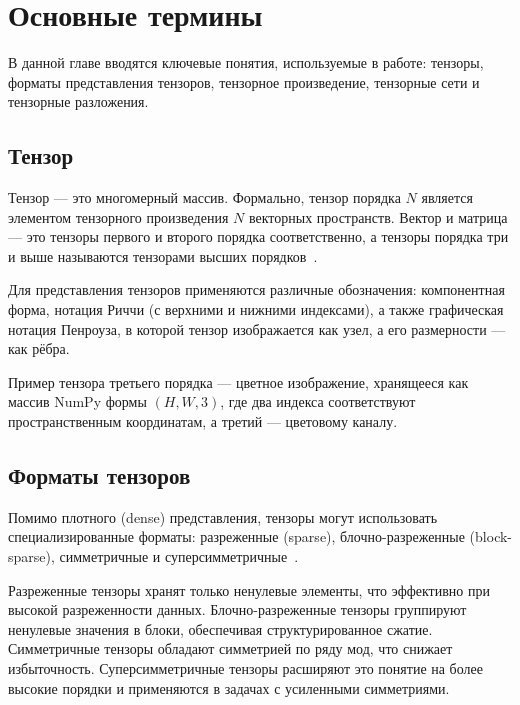 \chapter{Основные термины}
\label{chap:preliminaries}

В данной главе вводятся ключевые понятия, используемые в работе: тензоры, форматы представления тензоров, тензорное произведение, тензорные сети и тензорные разложения.

\section*{Тензор}
\label{sec:tensor}

Тензор — это многомерный массив. Формально, тензор порядка \(N\) является элементом тензорного произведения \(N\) векторных пространств. Вектор и матрица — это тензоры первого и второго порядка соответственно, а тензоры порядка три и выше называются тензорами высших порядков~\cite{tensorly_parafac_tucker}.

Для представления тензоров применяются различные обозначения: компонентная форма, нотация Риччи (с верхними и нижними индексами), а также графическая нотация Пенроуза, в которой тензор изображается как узел, а его размерности — как рёбра.

Пример тензора третьего порядка — цветное изображение, хранящееся как массив NumPy формы \((H, W, 3)\), где два индекса соответствуют пространственным координатам, а третий — цветовому каналу.

\section*{Форматы тензоров}
\label{sec:tensor_formats}

Помимо плотного (dense) представления, тензоры могут использовать специализированные форматы: разреженные (sparse), блочно-разреженные (block-sparse), симметричные и суперсимметричные~\cite{tensor_calculus, sparse_tensor, sparse_and_block_sparse_tensors}.

Разреженные тензоры хранят только ненулевые элементы, что эффективно при высокой разреженности данных. Блочно-разреженные тензоры группируют ненулевые значения в блоки, обеспечивая структурированное сжатие. Симметричные тензоры обладают симметрией по ряду мод, что снижает избыточность. Суперсимметричные тензоры расширяют это понятие на более высокие порядки и применяются в задачах с усиленными симметриями.

